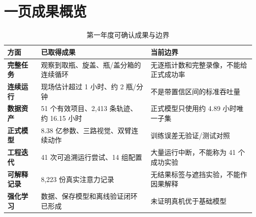 
\section*{一页成果概览}
\begin{table}[H]
\centering
\caption{第一年度可确认成果与边界}
\begin{tabularx}{\textwidth}{>{\bfseries}p{31mm}p{35mm}X}
\toprule
方面 & 已取得成果 & 当前边界\\
\midrule
完整任务 & 观察到取瓶、旋盖、瓶/盖分箱的连续循环 & 无逐瓶计数和完整录像，不能给正式成功率\\
连续运行 & 现场估计超过 1 小时、约 2 瓶/分钟 & 不是带置信区间的标准吞吐量\\
数据资产 & 51 个有效项目、2,413 条轨迹、约 16.15 小时 & 正式模型只使用约 4.89 小时唯一子集\\
正式模型 & 8.38 亿参数、三路视觉、双臂连续动作 & 训练误差无验证/测试对照\\
工程迭代 & 41 次可追溯运行尝试、14 组配置 & 大量运行中断，不能称为 41 个成功实验\\
可解释记录 & 8,223 份真实注意力记录 & 无结果标签与遮挡实验，不能作因果解释\\
强化学习 & 数据、保存模型和离线验证闭环已形成 & 未证明真机优于基础模型\\
\bottomrule
\end{tabularx}
\end{table}
